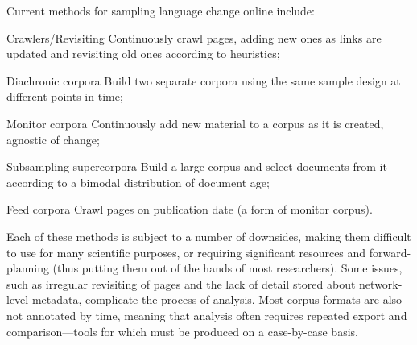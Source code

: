 Current methods for sampling language change online include:

\begin{itemizeTitle}

    \item[Crawlers/Revisiting] Continuously crawl pages, adding new ones as links are updated and revisiting old ones according to heuristics;
    \item[Diachronic corpora] Build two separate corpora using the same sample design at different points in time;
    \item[Monitor corpora] Continuously add new material to a corpus as it is created, agnostic of change;
    \item[Subsampling supercorpora] Build a large corpus and select documents from it according to a bimodal distribution of document age;
    \item[Feed corpora] Crawl pages on publication date (a form of monitor corpus).

\end{itemizeTitle}


Each of these methods is subject to a number of downsides, making them difficult to use for many scientific purposes, or requiring significant resources and forward-planning (thus putting them out of the hands of most researchers).  Some issues, such as irregular revisiting of pages and the lack of detail stored about network-level metadata, complicate the process of analysis.  Most corpus formats are also not annotated by time, meaning that analysis often requires repeated export and comparison---tools for which must be produced on a case-by-case basis.

% 
% 


